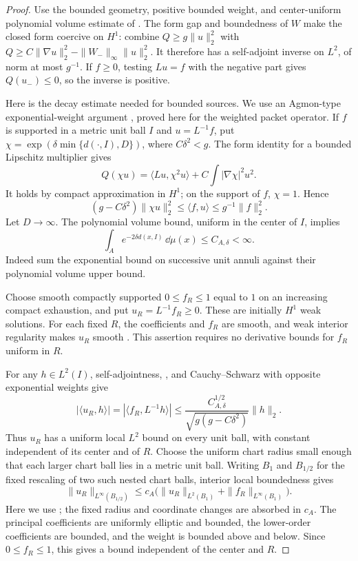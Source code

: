 \begin{proof}
Use the bounded geometry, positive bounded weight, and center-uniform
polynomial volume estimate of .  The form gap
and boundedness of $W$ make the closed form coercive on $H^1$:
combine $Q\ge g\|u\|_2^2$ with
$Q\ge C\|\nabla u\|_2^2-\|W_-\|_\infty\|u\|_2^2$.
It therefore has a self-adjoint inverse on $L^2$, of norm at most
$g^{-1}$.  If $f\ge0$, testing $Lu=f$ with the negative part gives
$Q(u_-)\le0$, so the inverse is positive.

Here is the decay estimate needed for bounded sources.  We use an
Agmon-type exponential-weight argument \citep{agmon1982}, proved here
for the weighted packet operator.  If $f$ is
supported in a metric unit ball $I$ and $u=L^{-1}f$, put
$\chi=\exp(\delta\min\{d(\cdot,I),D\})$, where $C\delta^2<g$.
The form identity for a bounded Lipschitz multiplier gives
\[
 Q(\chi u)=\langle Lu,\chi^2u\rangle+
                  C\int|\nabla\chi|^2u^2.
\]
It holds by compact approximation in $H^1$; on the support of $f$,
$\chi=1$.  Hence
\begin{equation}\label{regular:off-diagonal}
 (g-C\delta^2)\|\chi u\|_2^2
 \le\langle f,u\rangle\le g^{-1}\|f\|_2^2.
\end{equation}
Let $D\to\infty$.  The polynomial volume bound, uniform in the
center of $I$, implies
\[
 \int_A e^{-2\delta d(x,I)}\,\dd\mu(x)\le C_{A,\delta}<\infty.
\]
Indeed sum the exponential bound on successive unit annuli against
their polynomial volume upper bound.

Choose smooth compactly supported $0\le f_R\le1$ equal to $1$ on
an increasing compact exhaustion, and put $u_R=L^{-1}f_R\ge0$.
These are initially $H^1$ weak solutions.  For each fixed $R$, the
coefficients and $f_R$ are smooth, and weak interior regularity makes
$u_R$ smooth
\citep[Lecture~6, Theorem~1 and Corollary~1]{simonPDE}.
This assertion requires no derivative bounds for $f_R$ uniform in $R$.

For any $h\in L^2(I)$, self-adjointness,
, and Cauchy--Schwarz with opposite
exponential weights give
\[
 |\langle u_R,h\rangle|
 =|\langle f_R,L^{-1}h\rangle|
 \le\frac{C_{A,\delta}^{1/2}}{\sqrt{g(g-C\delta^2)}}\|h\|_2.
\]
Thus $u_R$ has a uniform local $L^2$ bound on every unit ball, with
constant independent of its center and of $R$.  Choose the uniform
chart radius small enough that each larger chart ball lies in a
metric unit ball.  Writing $B_1$ and $B_{1/2}$ for the fixed rescaling
of two such nested chart balls, interior local boundedness gives
\[
 \|u_R\|_{L^\infty(B_{1/2})}
 \le c_A\bigl(\|u_R\|_{L^2(B_1)}
                      +\|f_R\|_{L^\infty(B_1)}\bigr).
\]
Here we use \citet[Lecture~18, Theorem~2, with $p=2$]{simonPDE};
the fixed radius and coordinate changes are absorbed in $c_A$.
The principal coefficients are
uniformly elliptic and bounded, the lower-order coefficients are
bounded, and the weight is bounded above and below.  Since
$0\le f_R\le1$, this gives a bound independent of the center and $R$.


\end{proof}
